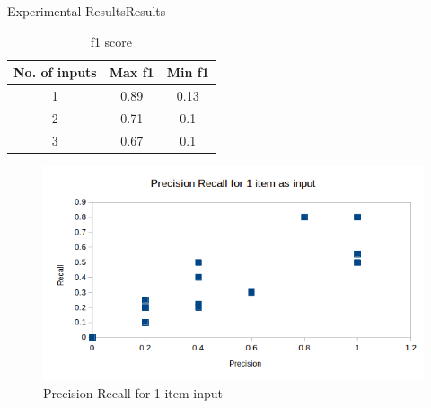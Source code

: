 \documentclass[10pt]{beamer}
\begin{document}
\begin{frame}{Experimental Results}{Results}
\begin{table}
\centering
\caption{f1 score}
\begin{tabular}{|c|c|c|}
\hline
No. of inputs & Max f1 & Min f1\\
\hline\hline
1 & 0.89 & 0.13\\
2 & 0.71 & 0.1\\
3 & 0.67 & 0.1\\
\hline\end{tabular}
\label{table:f1}
\end{table}
\begin{figure}[htb]
\centering
\includegraphics[scale=0.4]{g11}
\caption{Precision-Recall for 1 item input}
\label{fig:g1}
\end{figure}
\end{frame}
\end{document}
